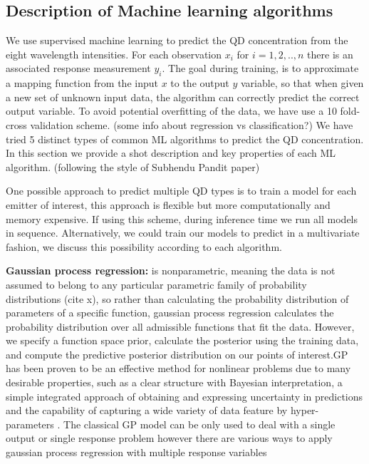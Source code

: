 \documentclass[journal,twoside,web]{ieeecolor}
\begin{document}
\subsection{Description of Machine learning algorithms}

We use supervised machine learning to predict the QD concentration from the eight wavelength intensities. For each observation $x_i$ for $i = 1,2,..,n$ there is an associated response measurement $y_i$. The goal during training, is to approximate a mapping function from the input $x$ to the output $y$ variable, so that when given a new set of unknown input data, the algorithm can correctly predict the correct output variable.  To avoid potential overfitting of the data, we have use a 10 fold-cross validation scheme.
(some info about regression vs classification?)
We have tried 5 distinct types of common ML algorithms to predict the QD concentration. In this section we provide a shot description and key properties of each ML algorithm.
(following the style of Subhendu Pandit paper) 

One possible approach to predict multiple QD types is to train a model for each emitter of interest, this approach is flexible but more computationally and memory expensive. If using this scheme, during inference time we run all models in sequence. Alternatively, we could train our models to predict in a multivariate fashion, we discuss this possibility according to each algorithm. 

\textbf{Gaussian process regression: } is nonparametric, meaning the data is not assumed to belong to any particular parametric family of probability distributions (cite x), so rather than calculating the probability distribution of parameters of a specific function, gaussian process regression calculates the probability distribution over all admissible functions that fit the data. However, we specify a function space prior, calculate the posterior using the training data, and compute the predictive posterior distribution on our points of interest.GP has been proven to be an effective method for
nonlinear problems due to many desirable properties, such as a clear structure with Bayesian interpretation,
a simple integrated approach of obtaining and expressing uncertainty in predictions and the capability of
capturing a wide variety of data feature by hyper-parameters \cite{Zhao2009}. 
The classical GP model can be only used to deal with a single output or single response problem however there are various ways to apply gaussian process regression with multiple response variables \cite{Zhao2009}
\end{document}

